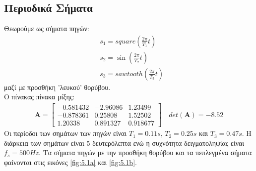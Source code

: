 \subsection{Περιοδικά Σήματα}
\justifying
Θεωρούμε ως σήματα πηγών: \en
\begin{align*}
    &s_1 = square(\frac{2\pi}{T_1} t) \\
    &s_2 = \sin (\frac{2\pi}{T_2} t) \\
    &s_3 = sawtooth(\frac{2\pi}{T_3} t)
\end{align*} \gr
μαζί με προσθήκη 'λευκού' θορύβου.
\\
O πίνακας πίνακα μίξης: \en
\begin{align*}
    \mathbf{A} = \begin{bmatrix}
    -0.581432 & -2.96086 & 1.23499 \\
    -0.878361 & 0.25808 & 1.52502 \\
    1.20338 & 0.891327 & 0.918677
    \end{bmatrix}  \quad det(\mathbf{A}) = -8.52
\end{align*} \gr
Οι περίοδοι των σημάτων των πηγών είναι \en $T_1 = 0.11 s$, $T_2 = 0.25 s$ \gr και \en $T_3 = 0.47 s$. \gr Η διάρκεια των σημάτων είναι 5 δευτερόλεπτα ενώ η συχνότητα δειγματοληψίας είναι \en $f_s = 500 Hz$. \gr Τα σήματα πηγών με την προσθήκη θορύβου και τα πεπλεγμένα σήματα φαίνονται στις εικόνες \ref{fig:5.1a} και \ref{fig:5.1b}.
